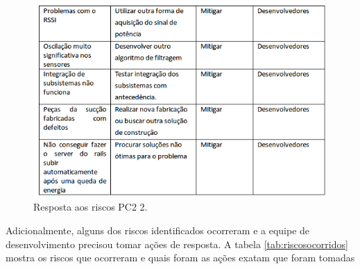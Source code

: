 \begin{figure}[H]
	\centering
	\includegraphics[scale=0.5]{figuras/riscos_acao_pc2_2.png}
	\caption{Resposta aos riscos PC2 2.}
	\label{img:respostasriscospc22}
\end{figure}

Adicionalmente, alguns dos riscos identificados ocorreram e a equipe de desenvolvimento precisou tomar ações de resposta. A tabela \ref{tab:riscosocorridos} mostra os riscos que ocorreram e quais foram as ações exatam que foram tomadas

